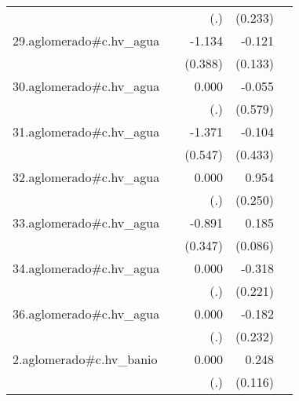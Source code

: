 {\begin{longtable}{l*{4}{D{.}{.}{-1}}}
            &                     &         (.)         &     (0.233)         &                     \\
\addlinespace
29.aglomerado#c.hv\_agua&                     &      -1.134\sym{**} &      -0.121         &                     \\
            &                     &     (0.388)         &     (0.133)         &                     \\
\addlinespace
30.aglomerado#c.hv\_agua&                     &       0.000         &      -0.055         &                     \\
            &                     &         (.)         &     (0.579)         &                     \\
\addlinespace
31.aglomerado#c.hv\_agua&                     &      -1.371\sym{*}  &      -0.104         &                     \\
            &                     &     (0.547)         &     (0.433)         &                     \\
\addlinespace
32.aglomerado#c.hv\_agua&                     &       0.000         &       0.954\sym{***}&                     \\
            &                     &         (.)         &     (0.250)         &                     \\
\addlinespace
33.aglomerado#c.hv\_agua&                     &      -0.891\sym{*}  &       0.185\sym{*}  &                     \\
            &                     &     (0.347)         &     (0.086)         &                     \\
\addlinespace
34.aglomerado#c.hv\_agua&                     &       0.000         &      -0.318         &                     \\
            &                     &         (.)         &     (0.221)         &                     \\
\addlinespace
36.aglomerado#c.hv\_agua&                     &       0.000         &      -0.182         &                     \\
            &                     &         (.)         &     (0.232)         &                     \\
\addlinespace
2.aglomerado#c.hv\_banio&                     &       0.000         &       0.248\sym{*}  &                     \\
            &                     &         (.)         &     (0.116)         &                     \\

\end{longtable}}
